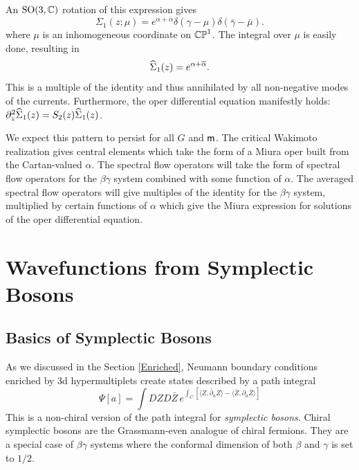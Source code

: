 \documentclass[11pt,a4paper]{article}
\begin{document}
An ${\mathrm{SO}}(3,{\mathbb C})$ rotation of this expression gives 
\begin{equation}
\Sigma_1(z;\mu) = e^{\alpha+ \bar \alpha} \delta(\gamma -\mu)\delta(\bar \gamma- \bar \mu).
\end{equation}
where $\mu$ is an inhomogeneous coordinate on ${\mathbb{CP}}^1$.  
The integral over $\mu$ is easily done, resulting in
\begin{equation}
\widehat\Sigma_1(z) = e^{\alpha+ \overline \alpha} .
\end{equation}
This is a multiple of the identity and thus annihilated by all non-negative modes of the currents. Furthermore, the oper differential equation manifestly holds: $\partial_z^2 \widehat\Sigma_1(z) = S_2(z)\widehat\Sigma_1(z)$.

We expect this pattern to persist for all $G$ and ${\sf m}$. The critical Wakimoto realization gives central 
elements which take the form of a Miura oper built from the Cartan-valued $\alpha$. The spectral flow operators will take the form of spectral flow operators for the $\beta \gamma$ system combined with some function of $\alpha$. The averaged spectral flow operators will give multiples of the identity for the $\beta \gamma$ system, multiplied by certain functions of $\alpha$
which give the Miura expression for solutions of the oper differential equation. 

\section{Wavefunctions from Symplectic Bosons} \label{sec:symp}

\subsection{Basics of Symplectic Bosons}\label{sb}
As we discussed in the  Section \ref{Enriched}, Neumann boundary conditions enriched by 3d hypermultiplets create states described by a path integral 
\begin{equation}
\Psi[a] = \int DZ D\bar Z\, e^{\int_C \left[\langle Z, \bar \partial_a Z \rangle -  \langle 
\bar Z, \partial_a \bar Z \rangle\right]}
\end{equation} 
This is a non-chiral version of the path integral for {\it symplectic bosons}. Chiral symplectic bosons are the Grassmann-even analogue of chiral fermions. They are a special case of $\beta \gamma$ systems where the conformal dimension of both $\beta$ and $\gamma$ is set to $1/2$.
\end{document}
